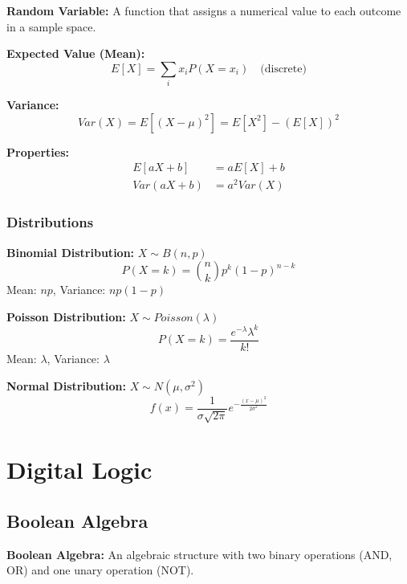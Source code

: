 \documentclass[11pt,a4paper]{article}
\begin{document}
\begin{defbox}
\textbf{Random Variable:} A function that assigns a numerical value to each outcome in a sample space.
\end{defbox}

\begin{defbox}
\textbf{Expected Value (Mean):}
\[
    E[X] = \sum_{i} x_i P(X = x_i) \quad \text{(discrete)}
\]
\end{defbox}

\begin{defbox}
\textbf{Variance:}
\[
    Var(X) = E[(X - \mu)^2] = E[X^2] - (E[X])^2
\]
\end{defbox}

\textbf{Properties:}
\begin{align*}
    E[aX + b] &= aE[X] + b \\
    Var(aX + b) &= a^2 Var(X)
\end{align*}

\subsubsection{Distributions}

\textbf{Binomial Distribution:} $X \sim B(n,p)$
\[
    P(X = k) = \binom{n}{k} p^k (1-p)^{n-k}
\]
Mean: $np$, Variance: $np(1-p)$

\textbf{Poisson Distribution:} $X \sim Poisson(\lambda)$
\[
    P(X = k) = \frac{e^{-\lambda} \lambda^k}{k!}
\]
Mean: $\lambda$, Variance: $\lambda$

\textbf{Normal Distribution:} $X \sim N(\mu, \sigma^2)$
\[
    f(x) = \frac{1}{\sigma\sqrt{2\pi}} e^{-\frac{(x-\mu)^2}{2\sigma^2}}
\]

\section{Digital Logic}

\subsection{Boolean Algebra}

\begin{defbox}
\textbf{Boolean Algebra:} An algebraic structure with two binary operations (AND, OR) and one unary operation (NOT).
\end{defbox}
\end{document}
